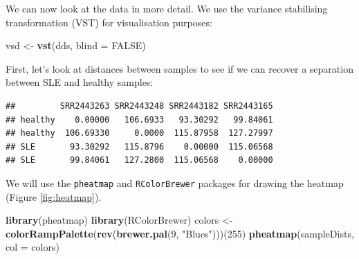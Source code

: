 \documentclass[9pt,a4paper,]{extarticle}
\newenvironment{Shaded}{\begin{snugshade}}{\end{snugshade}}
\newcommand{\KeywordTok}[1]{\textcolor[rgb]{0.13,0.29,0.53}{\textbf{#1}}}
\newcommand{\DataTypeTok}[1]{\textcolor[rgb]{0.13,0.29,0.53}{#1}}
\newcommand{\DecValTok}[1]{\textcolor[rgb]{0.00,0.00,0.81}{#1}}
\newcommand{\StringTok}[1]{\textcolor[rgb]{0.31,0.60,0.02}{#1}}
\newcommand{\OtherTok}[1]{\textcolor[rgb]{0.56,0.35,0.01}{#1}}
\newcommand{\OperatorTok}[1]{\textcolor[rgb]{0.81,0.36,0.00}{\textbf{#1}}}
\newcommand{\NormalTok}[1]{#1}
\begin{document}
We can now look at the data in more detail.
We use the variance stabilising transformation (VST) \citep{Anders2010} for visualisation purposes:

\begin{Shaded}
\begin{Highlighting}[]
\NormalTok{vsd <-}\StringTok{ }\KeywordTok{vst}\NormalTok{(dds, }\DataTypeTok{blind =} \OtherTok{FALSE}\NormalTok{)}
\end{Highlighting}
\end{Shaded}

First, let's look at distances between samples to see if we can recover a separation between SLE and healthy samples:

\begin{Shaded}
\end{Shaded}

\begin{verbatim}
##         SRR2443263 SRR2443248 SRR2443182 SRR2443165
## healthy    0.00000   106.6933   93.30292   99.84061
## healthy  106.69330     0.0000  115.87958  127.27997
## SLE       93.30292   115.8796    0.00000  115.06568
## SLE       99.84061   127.2800  115.06568    0.00000
\end{verbatim}

We will use the \texttt{pheatmap} \citep{Kolde2015} and \texttt{RColorBrewer} \citep{Neuwirth2014} packages for drawing the heatmap (Figure \ref{fig:heatmap}).

\begin{Shaded}
\begin{Highlighting}[]
\KeywordTok{library}\NormalTok{(pheatmap)}
\KeywordTok{library}\NormalTok{(RColorBrewer)}
\NormalTok{colors <-}\StringTok{ }\KeywordTok{colorRampPalette}\NormalTok{(}\KeywordTok{rev}\NormalTok{(}\KeywordTok{brewer.pal}\NormalTok{(}\DecValTok{9}\NormalTok{, }\StringTok{"Blues"}\NormalTok{)))(}\DecValTok{255}\NormalTok{)}
\KeywordTok{pheatmap}\NormalTok{(sampleDists, }\DataTypeTok{col =}\NormalTok{ colors)}
\end{Highlighting}
\end{Shaded}
\end{document}
